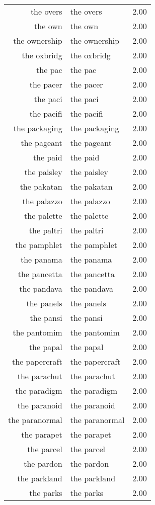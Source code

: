 \begin{table}[ht]
\begin{tabular}{rlr}
  the overs & the overs & 2.00 \\ 
  the own & the own & 2.00 \\ 
  the ownership & the ownership & 2.00 \\ 
  the oxbridg & the oxbridg & 2.00 \\ 
  the pac & the pac & 2.00 \\ 
  the pacer & the pacer & 2.00 \\ 
  the paci & the paci & 2.00 \\ 
  the pacifi & the pacifi & 2.00 \\ 
  the packaging & the packaging & 2.00 \\ 
  the pageant & the pageant & 2.00 \\ 
  the paid & the paid & 2.00 \\ 
  the paisley & the paisley & 2.00 \\ 
  the pakatan & the pakatan & 2.00 \\ 
  the palazzo & the palazzo & 2.00 \\ 
  the palette & the palette & 2.00 \\ 
  the paltri & the paltri & 2.00 \\ 
  the pamphlet & the pamphlet & 2.00 \\ 
  the panama & the panama & 2.00 \\ 
  the pancetta & the pancetta & 2.00 \\ 
  the pandava & the pandava & 2.00 \\ 
  the panels & the panels & 2.00 \\ 
  the pansi & the pansi & 2.00 \\ 
  the pantomim & the pantomim & 2.00 \\ 
  the papal & the papal & 2.00 \\ 
  the papercraft & the papercraft & 2.00 \\ 
  the parachut & the parachut & 2.00 \\ 
  the paradigm & the paradigm & 2.00 \\ 
  the paranoid & the paranoid & 2.00 \\ 
  the paranormal & the paranormal & 2.00 \\ 
  the parapet & the parapet & 2.00 \\ 
  the parcel & the parcel & 2.00 \\ 
  the pardon & the pardon & 2.00 \\ 
  the parkland & the parkland & 2.00 \\ 
  the parks & the parks & 2.00 \\ 

\end{tabular}
\end{table}
